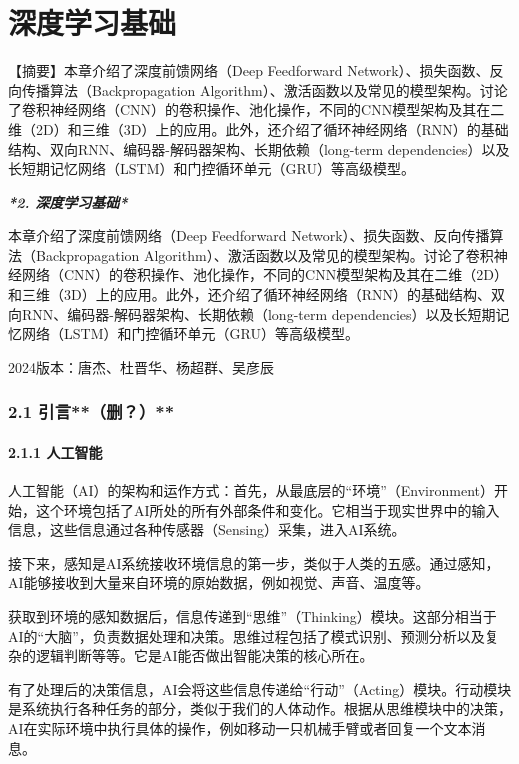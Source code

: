 \chapter{深度学习基础}

【摘要】本章介绍了深度前馈网络（Deep Feedforward Network）、损失函数、反向传播算法（Backpropagation Algorithm）、激活函数以及常见的模型架构。讨论了卷积神经网络（CNN）的卷积操作、池化操作，不同的CNN模型架构及其在二维（2D）和三维（3D）上的应用。此外，还介绍了循环神经网络（RNN）的基础结构、双向RNN、编码器-解码器架构、长期依赖（long-term dependencies）以及长短期记忆网络（LSTM）和门控循环单元（GRU）等高级模型。

\emph{\textbf{*2. 深度学习基础*}}

本章介绍了深度前馈网络（Deep Feedforward
Network）、损失函数、反向传播算法（Backpropagation
Algorithm）、激活函数以及常见的模型架构。讨论了卷积神经网络（CNN）的卷积操作、池化操作，不同的CNN模型架构及其在二维（2D）和三维（3D）上的应用。此外，还介绍了循环神经网络（RNN）的基础结构、双向RNN、编码器-解码器架构、长期依赖（long-term
dependencies）以及长短期记忆网络（LSTM）和门控循环单元（GRU）等高级模型。

2024版本：唐杰、杜晋华、杨超群、吴彦辰

\subsection{\texorpdfstring{\textbf{2.1
引言*}*（删？）**}{2.1 引言**（删？）**}}\label{21-ux5f15ux8a00ux5220}

\subsubsection{\texorpdfstring{\textbf{2.1.1
人工智能}}{2.1.1 人工智能}}\label{211-ux4ebaux5de5ux667aux80fd}

人工智能（AI）的架构和运作方式：首先，从最底层的``环境''（Environment）开始，这个环境包括了AI所处的所有外部条件和变化。它相当于现实世界中的输入信息，这些信息通过各种传感器（Sensing）采集，进入AI系统。

接下来，感知是AI系统接收环境信息的第一步，类似于人类的五感。通过感知，AI能够接收到大量来自环境的原始数据，例如视觉、声音、温度等。

获取到环境的感知数据后，信息传递到``思维''（Thinking）模块。这部分相当于AI的``大脑''，负责数据处理和决策。思维过程包括了模式识别、预测分析以及复杂的逻辑判断等等。它是AI能否做出智能决策的核心所在。

有了处理后的决策信息，AI会将这些信息传递给``行动''（Acting）模块。行动模块是系统执行各种任务的部分，类似于我们的人体动作。根据从思维模块中的决策，AI在实际环境中执行具体的操作，例如移动一只机械手臂或者回复一个文本消息。

